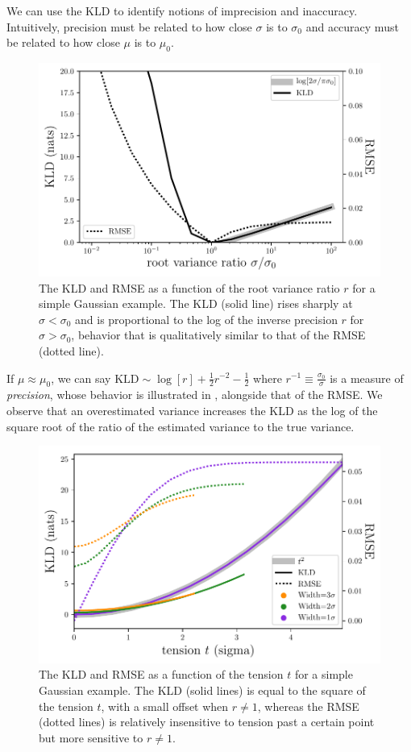 We can use the KLD to identify notions of imprecision and inaccuracy.
Intuitively, precision must be related to how close $\sigma$ is to $\sigma_{0}$ 
and accuracy must be related to how close $\mu$ is to $\mu_{0}$.

\begin{figure}
	\begin{center}
		\includegraphics[width=0.5\columnwidth]{figures/qp/precision.pdf}
		\caption{The KLD and RMSE as a function of the root variance ratio $r$ for 
			a simple Gaussian example.
			The KLD (solid line) rises sharply at $\sigma<\sigma_{0}$ and is 
			proportional to the log of the inverse precision $r$ for $\sigma>\sigma_{0}$, 
			behavior that is qualitatively similar to that of the RMSE (dotted line).
			}
	\end{center}
\end{figure}

If $\mu\approx\mu_{0}$, we can say $\mathrm{KLD}\sim\log[r] + \frac{1}{2}r^{-2} 
- \frac{1}{2}$ where $r^{-1}\equiv\frac{\sigma_{0}}{\sigma}$ is a measure of 
\textit{precision}, whose behavior is illustrated in 
, alongside that of the RMSE.  We observe that an 
overestimated variance increases the KLD as the log of the square root of the 
ratio of the estimated variance to the true variance.

\begin{figure}
	\begin{center}
		\includegraphics[width=0.5\columnwidth]{figures/qp/tension.pdf}
		\caption{The KLD and RMSE as a function of the tension $t$ for a simple 
			Gaussian example.
			The KLD (solid lines) is equal to the square of the tension $t$, with a 
			small offset when $r\neq1$, whereas the RMSE (dotted lines) is relatively 
			insensitive to tension past a certain point but more sensitive to $r\neq1$.
			}
	\end{center}
\end{figure}

